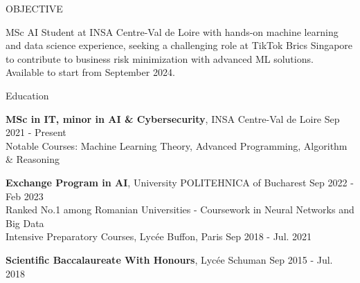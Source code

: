 \documentclass{resume} %
\begin{document}

\begin{rSection}{OBJECTIVE}

{MSc AI Student at INSA Centre-Val de Loire with hands-on machine learning and data science experience, seeking a challenging role at TikTok Brics Singapore to contribute to business risk minimization with advanced ML solutions. Available to start from September 2024.}

\end{rSection}


\begin{rSection}{Education}

{\bf MSc in IT, minor in AI \& Cybersecurity}, INSA Centre-Val de Loire \hfill {Sep 2021 - Present}\\
Notable Courses: Machine Learning Theory, Advanced Programming, Algorithm \& Reasoning 

{\bf Exchange Program in AI}, University POLITEHNICA of Bucharest \hfill {Sep 2022 - Feb 2023}\\
Ranked No.1 among Romanian Universities - Coursework in Neural Networks and Big Data \\
Intensive Preparatory Courses, Lycée Buﬀon, Paris \hfill {Sep 2018 - Jul. 2021}

{\bf Scientiﬁc Baccalaureate With Honours}, Lycée Schuman \hfill{Sep 2015 - Jul. 2018}
\\


\end{rSection}
\end{document}
